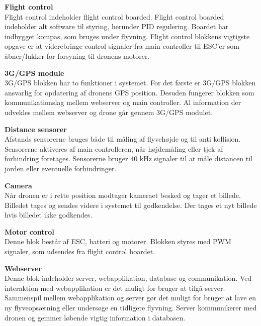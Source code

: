 \textbf{Flight control}\\
Flight control indeholder flight control boarded. Flight control boarded indeholder alt software til styring, herunder PID regulering. Boardet har indbygget kompas, som bruges under flyvning. Flight control blokkens vigtigste opgave er at viderebringe control signaler fra main controller til ESC'er som åbner/lukker for forsyning til dronens motorer.

\textbf{3G/GPS module}\\
3G/GPS blokken har to funktioner i systemet. For det første er 3G/GPS blokken ansvarlig for opdatering af dronens GPS position. Desuden fungerer blokken som kommunikationslag mellem webserver og main controller. Al information der udvekles mellem webserver og drone går gennem 3G/GPS modulet.

\textbf{Distance sensorer}\\
Afstands sensorerne bruges både til måling af flyvehøjde og til anti kollision. Sensorerne aktiveres af main controlleren, når højdemåling eller tjek af forhindring foretages. Sensorerne bruger 40 kHz signaler til at måle distancen til jorden eller eventuelle forhindringer.

\textbf{Camera}\\
Når dronen er i rette position modtager kameraet besked og tager et billede. Billedet tages og sendes videre i systemet til godkendelse. Der tages et nyt billede hvis billedet ikke godkendes.

\textbf{Motor control}\\
Denne blok består af ESC, batteri og motorer. Blokken styres med PWM signaler, som udsendes fra flight control boardet.

\textbf{Webserver}\\
Denne blok indeholder server, webapplikation, database og communikation. 
Ved interaktion med webapplikation er det muligt for bruger at tilgå server. Sammenspil mellem webapplikation og server gør det muligt for bruger at lave en ny flyveopsætning eller undersøge en tidligere flyvning. Server kommunikerer med dronen og gemmer løbende vigtig information i databasen.
